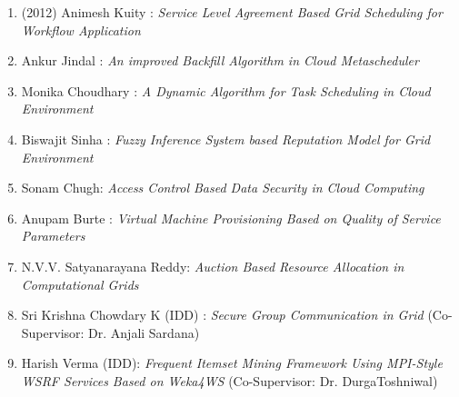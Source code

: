 
\begin{enumerate} %
\item	(2012) Animesh Kuity : 	\textit{Service Level Agreement Based Grid Scheduling for Workflow Application}
\item	Ankur Jindal : 	\textit{	An improved Backfill Algorithm in Cloud Metascheduler}
\item	Monika Choudhary : 	\textit{	A Dynamic Algorithm for Task Scheduling in Cloud Environment}	
\item	Biswajit Sinha : 	\textit{	Fuzzy Inference System based Reputation Model for Grid Environment} 
\item	Sonam Chugh: 	\textit{	Access Control Based Data Security in Cloud Computing} 
\item	Anupam Burte : 	\textit{	Virtual Machine Provisioning Based on Quality of Service Parameters}	
\item	N.V.V. Satyanarayana Reddy: 	\textit{	Auction Based Resource Allocation in Computational Grids	} 
\item   Sri Krishna Chowdary K (IDD) : 	\textit{	Secure Group Communication in Grid}  (Co-Supervisor: Dr. Anjali Sardana) 
\item	Harish Verma (IDD): 	\textit{	Frequent Itemset Mining Framework Using MPI-Style WSRF Services Based on Weka4WS} (Co-Supervisor: Dr. DurgaToshniwal)







\end{enumerate}

